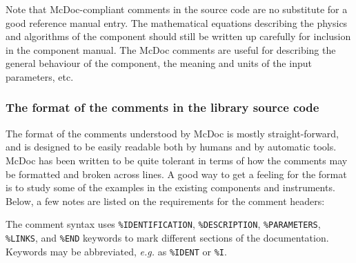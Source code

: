 Note that McDoc-compliant comments in the source code are no substitute
for a good reference manual entry. The mathematical equations describing
the physics and algorithms of the component should still be written up
carefully for inclusion in the component manual. The McDoc comments are
useful for describing the general behaviour of the component, the
meaning and units of the input parameters, etc.


\subsubsection{The format of the comments in the library source code}

The format of the comments understood by McDoc is mostly
straight-forward, and is designed to be easily readable both by humans
and by automatic tools. McDoc has been written to be quite tolerant in
terms of how the comments may be formatted and broken across lines. A
good way to get a feeling for the format is to study some of the examples
in the existing components and instruments. Below, a few
notes are listed on the requirements for the comment headers:

The comment syntax uses \verb+%IDENTIFICATION+, \verb+%DESCRIPTION+,
\verb+%PARAMETERS+, \verb+%LINKS+, and \verb+%END+
keywords to mark different sections of the documentation. Keywords may
be abbreviated, \textit{e.g.} as \verb+%IDENT+ or \verb+%I+.

